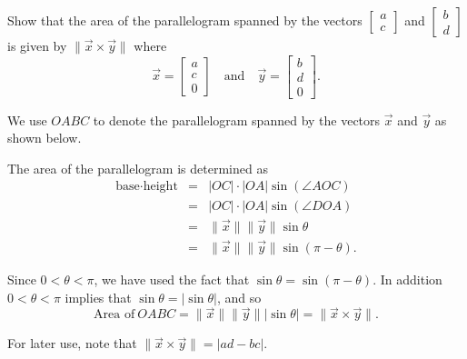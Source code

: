 \documentclass[../book.tex]{subfiles}
\begin{document}
\begin{example} \label{eg:area}
Show that the area of the parallelogram spanned by the vectors \(\begin{bmatrix}a\\ c\end{bmatrix}\) and \(\begin{bmatrix}b\\ d\end{bmatrix}\) is given by \(\| \vec{x} \times \vec{y}\|\) where
\begin{equation}\label{eq:vec-16}
\vec{x}
=
\begin{bmatrix}
  a \\ c \\ 0
\end{bmatrix}
\quad \text{and}\quad
\vec{y}
=
\begin{bmatrix}
  b \\ d \\ 0
\end{bmatrix}.
\end{equation}
\end{example}
\begin{solution}
We use \(OABC\) to denote the parallelogram spanned by the vectors \(\vec{x}\) and \(\vec{y}\) as shown below.

\begin{center}
  \label{fig:vec-2}
\end{center}

The area of the parallelogram is determined as
\begin{equation}\label{eq:vec-17}
\begin{array}{lcl}
  \text{base} \cdot \text{height}
  &=& |OC| \cdot |OA| \sin ( \angle AOC )\\
  &=& |OC| \cdot |OA| \sin ( \angle DOA ) \\
  &=& \| \vec{x}\| \| \vec{y}\|  \sin \theta \\
  &=& \| \vec{x}\| \| \vec{y}\|  \sin (\pi - \theta).
\end{array}
\end{equation}

Since \(0<\theta< \pi\), we have used the fact that \(\sin \theta =\sin(\pi - \theta)\). In addition \(0<\theta< \pi\) implies that \(\sin \theta = |\sin\theta|\), and so
\begin{equation}\label{eq:vec-18}
\text{Area of}\ OABC 
= \| \vec{x}\| \| \vec{y}\|  |\sin \theta | 
= \| \vec{x} \times \vec{y}\|.
\end{equation}

For later use, note that \(\|  \vec{x} \times \vec{y}\| = |ad-bc|\).
\end{solution}
\end{document}
